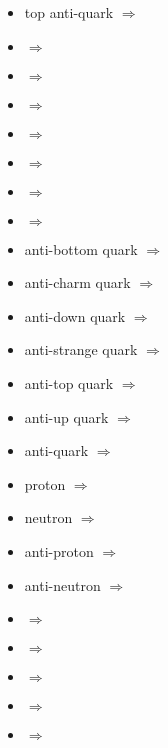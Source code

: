 \begin{multicols}{2}
{\begin{itemize}
\item top anti-quark\newline {} $\Rightarrow$ \Paqt
\item  {} $\Rightarrow$ \Pqb
\item  {} $\Rightarrow$ \Pqc
\item  {} $\Rightarrow$ \Pqd
\item  {} $\Rightarrow$ \Pqs
\item  {} $\Rightarrow$ \Pqt
\item  {} $\Rightarrow$ \Pqu
\item  {} $\Rightarrow$ \Pq
\item anti-bottom quark\newline {} $\Rightarrow$ \Paqb
\item anti-charm quark\newline {} $\Rightarrow$ \Paqc
\item anti-down quark\newline {} $\Rightarrow$ \Paqd
\item anti-strange quark\newline {} $\Rightarrow$ \Paqs
\item anti-top quark\newline {} $\Rightarrow$ \Paqt
\item anti-up quark\newline {} $\Rightarrow$ \Paqu
\item anti-quark\newline {} $\Rightarrow$ \Paq
\item proton\newline {} $\Rightarrow$ \Pp
\item neutron\newline {} $\Rightarrow$ \Pn
\item anti-proton\newline {} $\Rightarrow$ \Pap
\item anti-neutron\newline {} $\Rightarrow$ \Pan
\item  {} $\Rightarrow$ \Pcgc
\item  {} $\Rightarrow$ \Pcgcii
\item  {} $\Rightarrow$ \Pcgci
\item  {} $\Rightarrow$ \Pcgcz
\item  {} $\Rightarrow$ \Pfia

\end{itemize}}
\end{multicols}
